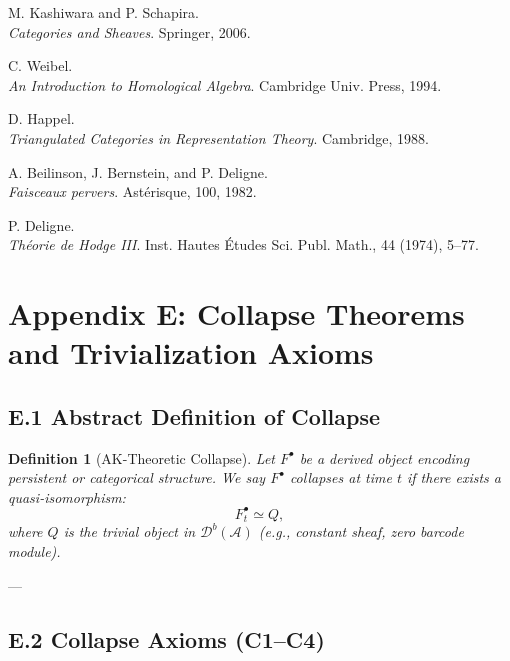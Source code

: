 \documentclass[11pt]{article}
\newtheorem{definition}[theorem]{Definition}
\begin{document}
\begin{thebibliography}{9}

M. Kashiwara and P. Schapira.\\
\textit{Categories and Sheaves}. Springer, 2006.

C. Weibel.\\
\textit{An Introduction to Homological Algebra}. Cambridge Univ. Press, 1994.

D. Happel.\\
\textit{Triangulated Categories in Representation Theory}. Cambridge, 1988.

A. Beilinson, J. Bernstein, and P. Deligne.\\
\textit{Faisceaux pervers}. Astérisque, 100, 1982.

P. Deligne.\\
\textit{Théorie de Hodge III}. Inst. Hautes Études Sci. Publ. Math., 44 (1974), 5–77.

\end{thebibliography}



\section*{Appendix E: Collapse Theorems and Trivialization Axioms}

\subsection*{E.1 Abstract Definition of Collapse}

\begin{definition}[AK-Theoretic Collapse]
Let $F^\bullet$ be a derived object encoding persistent or categorical structure.  
We say $F^\bullet$ \emph{collapses} at time $t$ if there exists a quasi-isomorphism:
\[
F^\bullet_t \simeq Q,
\]
where $Q$ is the trivial object in $\mathcal{D}^b(\mathcal{A})$ (e.g., constant sheaf, zero barcode module).
\end{definition}

---

\subsection*{E.2 Collapse Axioms (C1–C4)}
\end{document}
